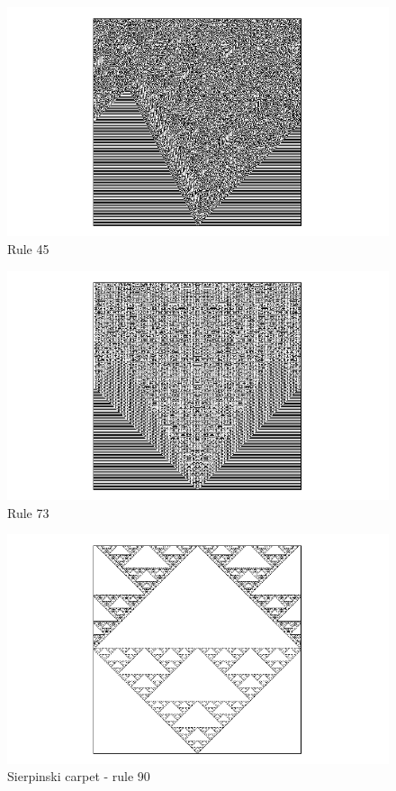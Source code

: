 \begin{figure}[!b]
 \centering
 \includegraphics[trim = 40mm 0mm 0mm 0mm, width=1.7\textwidth]{./img/45_500}
 \caption{Rule 45}
\end{figure}

\begin{figure}
 \centering
 \includegraphics[trim = 40mm 0mm 0mm 0mm, width=1.7\textwidth]{./img/73_500}
 \caption{Rule 73}
\end{figure}


\begin{figure}
 \centering
 \includegraphics[trim = 40mm 0mm 0mm 0mm, width=1.7\textwidth]{./img/90_500}
 \caption{Sierpinski carpet - rule 90}
 \label{koberec}
\end{figure}


